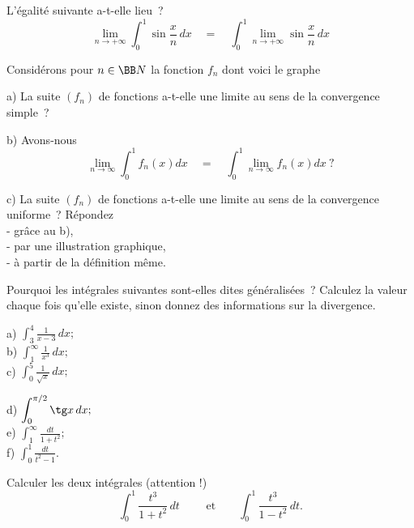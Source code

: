 \documentclass[12pt,french,oneside,a4paper]{memoir} %
\begin{document}
\begin{exo}
L'égalité suivante a-t-elle lieu~?
\begin{equation*}
\displaystyle{
\lim_{n\rightarrow+\infty}\int^1_0\sin\frac{x}{n}\,dx\quad=\quad
\int^1_0\lim_{n\rightarrow+\infty}\sin\frac{x}{n}\,dx}
\end{equation*}
\end{exo}
\begin{exo}
Considérons pour $n\in\BB N$ la fonction $f_n$ dont voici le
graphe
\vspace*{5cm}

a) La suite $(f_n)$ de fonctions a-t-elle une limite au sens de la
convergence simple~?

b) Avons-nous
$$
\displaystyle{
\lim_{n\rightarrow\infty}\int^1_0f_n(x)dx\quad=\quad
\int^1_0\lim_{n\rightarrow\infty}f_n(x)dx}~?
$$

c) La suite $(f_n)$ de fonctions a-t-elle une limite au sens de la
convergence uniforme~? Répondez\\
\hspace{1cm} - grâce au b),\\
\hspace{1cm} - par une illustration graphique,\\
\hspace{1cm} - à partir de la définition même.
\end{exo}
\begin{exo}
Pourquoi les intégrales suivantes sont-elles dites
\og généralisées\fg{}~? Calculez la valeur chaque fois qu'elle
existe, sinon donnez des informations sur la divergence.\\

\hfill
\begin{minipage}[t]{6cm}
a) $\displaystyle{\int^4_3\frac{1}{x-3}\,dx};$\\[2mm]
b) $\displaystyle{\int^\infty_1\frac{1}{x^3}\,dx;}$\\[2mm]
c) $\displaystyle{\int^5_0\frac{1}{\sqrt x}\,dx;}$\\[2mm]
\end{minipage}
\hfill
\begin{minipage}[t]{8cm}
d) $\displaystyle{\int^{\pi/2}_0\tg x\,dx;}$\\[2mm]
e) $\displaystyle{\int^\infty_1\frac{dt}{1+t^2};}$\\[2mm]
f) $\displaystyle{\int^1_0\frac{dt}{t^2-1}.}$\\[2mm]
\end{minipage}
\hfill
\end{exo}
\begin{exo}
Calculer les deux intégrales (attention !)
\begin{equation*}
\int^1_0\frac{t^3}{1+t^2}\,dt\qquad\mbox{ et
}\qquad\int^1_0\frac{t^3}{1-t^2}\,dt.
\end{equation*}
\end{exo}
\end{document}
